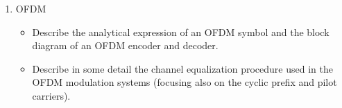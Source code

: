 \documentclass[11pt]{article}
\begin{document}
\begin{enumerate}
\item OFDM
\begin{itemize}
\item Describe the analytical expression of an OFDM symbol and the block diagram of an OFDM encoder and decoder.
\item Describe in some detail the channel equalization procedure used in the OFDM modulation systems (focusing also on the cyclic prefix and pilot carriers).


\end{itemize}


\end{enumerate}
\end{document}
